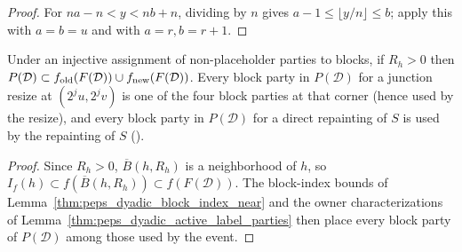 \begin{proof}\leanok
    For $na-n<y<nb+n$, dividing by $n$ gives $a-1\le\lfloor y/n\rfloor\le b$;
    apply this with $a=b=u$ and with $a=r,b=r+1$.
\end{proof}

\begin{lemma}
    \label{thm:peps_dyadic_patch_rewrite_parties}
    \leanok
    Under an injective assignment of non-placeholder parties to blocks, if
    $R_h>0$ then $P(\mathcal D)\subset f_{\rm old}(F(\mathcal D))\cup f_{\rm new}(F(\mathcal D))$.
    Every block party in $P(\mathcal D)$ for a junction resize at $(2^ju,2^jv)$ is
    one of the four block parties at that corner (hence used by the resize), and
    every block party in $P(\mathcal D)$ for a direct repainting of $S$ is used by
    the repainting of $S$
    (\cite[Section~7, lines 500--541, 585--594]{OpenAI2026PolynomialPEPS}).
\end{lemma}

\begin{proof}\leanok
    Since $R_h>0$, $\overline B(h,R_h)$ is a neighborhood of $h$, so
    $I_f(h)\subset f(\overline B(h,R_h))\subset f(F(\mathcal D))$. The block-index
    bounds of Lemma~\ref{thm:peps_dyadic_block_index_near} and the owner
    characterizations of Lemma~\ref{thm:peps_dyadic_active_label_parties} then
    place every block party of $P(\mathcal D)$ among those used by the event.
\end{proof}

